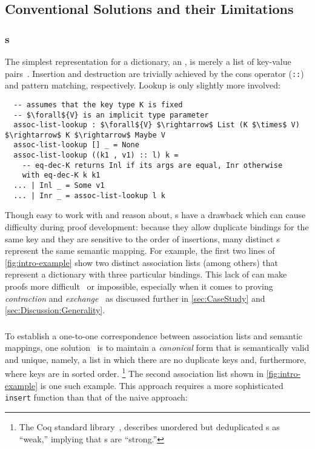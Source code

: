 \subsection{Conventional Solutions and their Limitations}



\subsubsection{\Sal{}s}

The simplest representation for a dictionary, an \emph{\sal}, is merely a list of key-value pairs~\citep[Lists]{Pierce:SF1}.
%
Insertion and destruction are trivially achieved by the cons operator (\texttt{::}) and pattern matching, respectively.
%
Lookup is only slightly more involved:
%
\begin{lstlisting}
  -- assumes that the key type K is fixed
  -- $\forall${V} is an implicit type parameter
  assoc-list-lookup : $\forall${V} $\rightarrow$ List (K $\times$ V) $\rightarrow$ K $\rightarrow$ Maybe V
  assoc-list-lookup [] _ = None
  assoc-list-lookup ((k1 , v1) :: l) k =
    -- eq-dec-K returns Inl if its args are equal, Inr otherwise
    with eq-dec-K k k1
  ... | Inl _ = Some v1
  ... | Inr _ = assoc-list-lookup l k
\end{lstlisting}

Though easy to work with and reason about, \sal{}s have a drawback which can cause difficulty during proof development:
%
because they allow duplicate bindings for the same key and they are sensitive to the order of insertions, many distinct \sal{}s represent the same semantic mapping.
%
For example, the first two lines of \autoref{fig:intro-example}
%
show two distinct association lists (among others) that represent a dictionary with three particular bindings.
%
This lack of \firstUseGoal{\Extensional} can make proofs more difficult~\cite[Maps]{Pierce:SF1} or impossible, especially when it comes to proving \emph{contraction} and \emph{exchange}~\citep{StructProp}
%
as discussed further in \autoref{sec:CaseStudy} and \autoref{sec:Discussion:Generality}.


\newpage %
\subsubsection{\Cals}

To establish a one-to-one correspondence between association lists and semantic mappings, one solution~\citep{FMapList} is to maintain a \emph{canonical}
%
form that is semantically valid and unique, namely, a list in which there are no duplicate keys and, furthermore, where keys are in sorted order.%
%
\footnote{\hspace{0.01in}%
%
The Coq standard library~\citep{FMapInterface}, describes unordered but deduplicated \sal{}s as ``weak,'' implying that \cal{}s are ``strong.''
%
}
%
The second association list shown in \autoref{fig:intro-example} is one such example.
%
This approach requires a more sophisticated \texttt{insert} function than that of the naive \sal{} approach:

